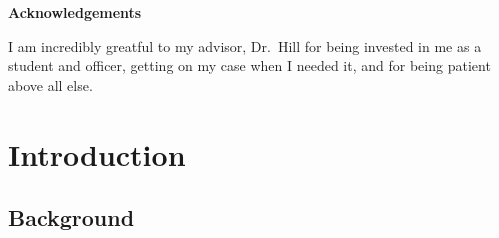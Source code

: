 \documentclass[12pt,letterpaper,toc=flat,oneside]{report}
\theoremstyle{definition}
\theoremstyle{definition}
\theoremstyle{definition}
\theoremstyle{remark}
\begin{document}
\thispagestyle{plain}
    \begin{center}
	\Large\bfseries Acknowledgements
    \end{center}
    \vspace{3em}
    I am incredibly greatful to my advisor, Dr.~Hill for being invested in
    me as a student and officer, getting on my case when I needed it, and
    for being patient above all else.
 \newpage
\renewcommand\contentsname{\centering \Large Table of Contents}
\singlespace
\tableofcontents
\newpage
\renewcommand\listtablename{\centering \Large List of Tables}
\listoftables
\newpage
\renewcommand\listfigurename{\centering \Large List of Figures}
\listoffigures
\newpage
\setcounter{chapter}{0}
\doublespacing
\setcounter{page}{1}
	\renewcommand{\thepage}{\arabic{page}}
\hypertarget{introduction}{%
\chapter{Introduction}\label{introduction}}

\hypertarget{background}{%
\section{Background}\label{background}}
\end{document}
